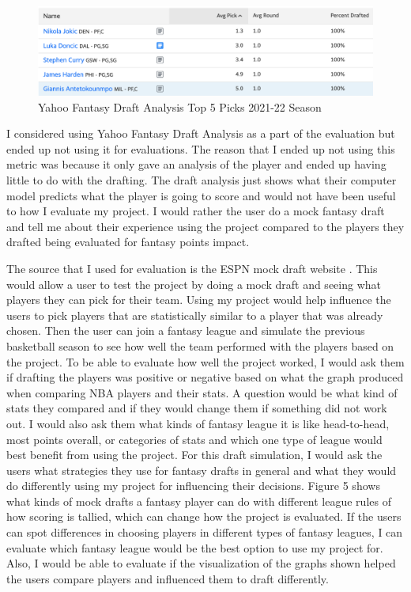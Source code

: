 \documentclass[10pt,twocolumn]{article}
\begin{document}
\begin{figure}
    \centering
    \includegraphics[width=.98\linewidth]{top5.png}
    \caption{
        Yahoo Fantasy Draft Analysis Top 5 Picks 2021-22 Season
    }
    \label{fig:second-page-4}
\end{figure}

I considered using Yahoo Fantasy Draft Analysis as a part of the evaluation but ended up not using it for evaluations. The reason that I ended up not using this metric was because it only gave an analysis of the player and ended up having little to do with the drafting. The draft analysis just shows what their computer model predicts what the player is going to score and would not have been useful to how I evaluate my project. I would rather the user do a mock fantasy draft and tell me about their experience using the project compared to the players they drafted being evaluated for fantasy points impact. 

The source that I used for evaluation is the ESPN mock draft website \cite{fantasyDraft}. This would allow a user to test the project by doing a mock draft and seeing what players they can pick for their team. Using my project would help influence the users to pick players that are statistically similar to a player that was already chosen. Then the user can join a fantasy league and simulate the previous basketball season to see how well the team performed with the players based on the project. To be able to evaluate how well the project worked, I would ask them if drafting the players was positive or negative based on what the graph produced when comparing NBA players and their stats. A question would be what kind of stats they compared and if they would change them if something did not work out. I would also ask them what kinds of fantasy league it is like head-to-head, most points overall, or categories of stats and which one type of league would best benefit from using the project. For this draft simulation, I would ask the users what strategies they use for fantasy drafts in general and what they would do differently using my project for influencing their decisions. Figure 5 shows what kinds of mock drafts a fantasy player can do with different league rules of how scoring is tallied, which can change how the project is evaluated. If the users can spot differences in choosing players in different types of fantasy leagues, I can evaluate which fantasy league would be the best option to use my project for. Also, I would be able to evaluate if the visualization of the graphs shown helped the users compare players and influenced them to draft differently.
\end{document}
